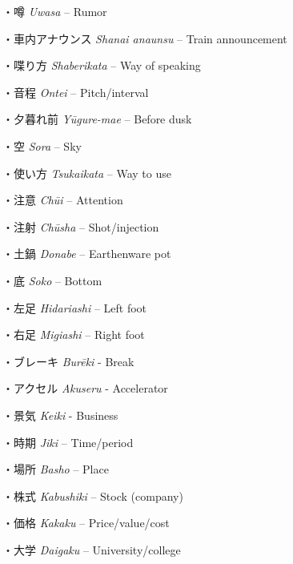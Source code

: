 \par{・噂 \emph{Uwasa }– Rumor }

\par{・車内アナウンス \emph{Shanai anaunsu }– Train announcement }

\par{・喋り方 \emph{Shaberikata }– Way of speaking }

\par{・音程 \emph{Ontei }– Pitch\slash interval }

\par{・夕暮れ前 \emph{Yūgure-mae }– Before dusk }

\par{・空 \emph{Sora }– Sky }

\par{・使い方 \emph{Tsukaikata }– Way to use }

\par{・注意 \emph{Chūi }– Attention }

\par{・注射 \emph{Chūsha }– Shot\slash injection }

\par{・土鍋 \emph{Donabe }– Earthenware pot }

\par{・底 \emph{Soko }– Bottom }

\par{・左足 \emph{Hidariashi }– Left foot }

\par{・右足 \emph{Migiashi }– Right foot }

\par{・ブレーキ \emph{Burēki }- Break }

\par{・アクセル \emph{Akuseru }- Accelerator }

\par{・景気 \emph{Keiki }- Business }

\par{・時期 \emph{Jiki }– Time\slash period }

\par{・場所 \emph{Basho }– Place }

\par{・株式 \emph{Kabushiki }– Stock (company) }

\par{・価格 \emph{Kakaku }– Price\slash value\slash cost }

\par{・大学 \emph{Daigaku }– University\slash college }


